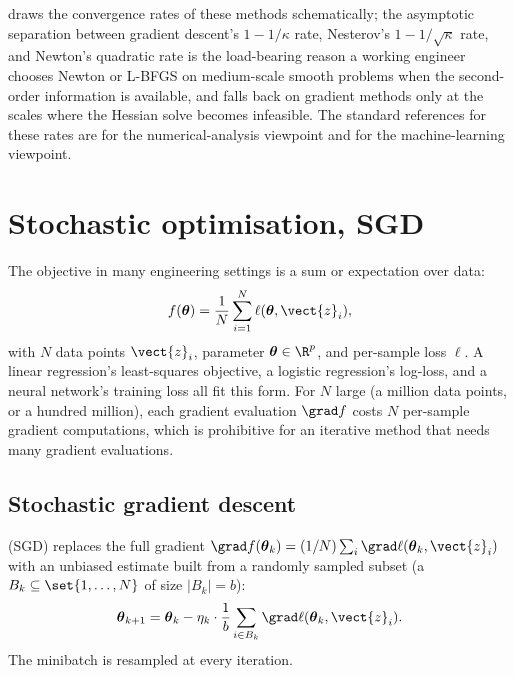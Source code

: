  draws the convergence
rates of these methods schematically; the asymptotic separation
between gradient descent's $1 - 1/\kappa$ rate, Nesterov's
$1 - 1/\sqrt{\kappa}$ rate, and Newton's quadratic rate is the
load-bearing reason a working engineer chooses Newton or L-BFGS on
medium-scale smooth problems when the second-order information is
available, and falls back on gradient methods only at the scales
where the Hessian solve becomes infeasible. The standard
references for these rates are
\textcite{text:v2ch15-nocedal-wright2006} for the numerical-analysis
viewpoint and \textcite{text:v2ch15-bottou-curtis-nocedal2018} for
the machine-learning viewpoint.



\section{Stochastic optimisation, SGD}

The objective in many engineering settings is a sum or expectation
over data:
\[
f(\boldsymbol{\theta}) = \frac{1}{N} \sum_{i=1}^{N}
\ell(\boldsymbol{\theta}, \vect{z}_{i}),
\]
with $N$ data points $\vect{z}_{i}$, parameter
$\boldsymbol{\theta} \in \R^{p}$, and per-sample loss $\ell$. A
linear regression's least-squares objective, a logistic regression's
log-loss, and a neural network's training loss all fit this form.
For $N$ large (a million data points, or a hundred million), each
gradient evaluation $\grad f$ costs $N$ per-sample gradient
computations, which is prohibitive for an iterative method that
needs many gradient evaluations.

\subsection{Stochastic gradient descent}

\begin{definition}
 (SGD) replaces the full
gradient $\grad f(\boldsymbol{\theta}_{k}) = (1/N) \sum_{i} \grad
\ell(\boldsymbol{\theta}_{k}, \vect{z}_{i})$ with an unbiased
estimate built from a randomly sampled subset (a 
$B_{k} \subseteq \set{1, \ldots, N}$ of size $|B_{k}| = b$):
\[
\boldsymbol{\theta}_{k+1} = \boldsymbol{\theta}_{k} - \eta_{k}
\cdot \frac{1}{b} \sum_{i \in B_{k}} \grad
\ell(\boldsymbol{\theta}_{k}, \vect{z}_{i}).
\]
The minibatch is resampled at every iteration.
\end{definition}


